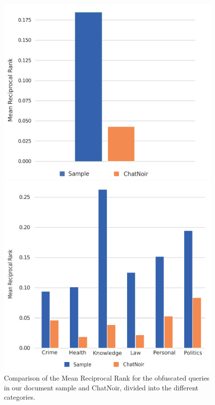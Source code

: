 \begin{figure}[t]
    \vspace*{-.5cm}
    \begin{minipage}[b][][b]{0.45\textwidth}
    \centering
    \includegraphics[width=1.0\textwidth]{graphics/evaluation/mrr_index_cw12.pdf}
    \end{minipage}
    \hfill
    \begin{minipage}[b][][b]{0.45\textwidth}
    \centering
    \includegraphics[width=1.0\textwidth]{graphics/evaluation/mrr_categories_both_level.pdf}
    \end{minipage}
\caption{Comparison of the Mean Reciprocal Rank for the obfuscated queries in our document sample and ChatNoir, divided into the different categories.}
    \label{fig:mrr}
\end{figure}


